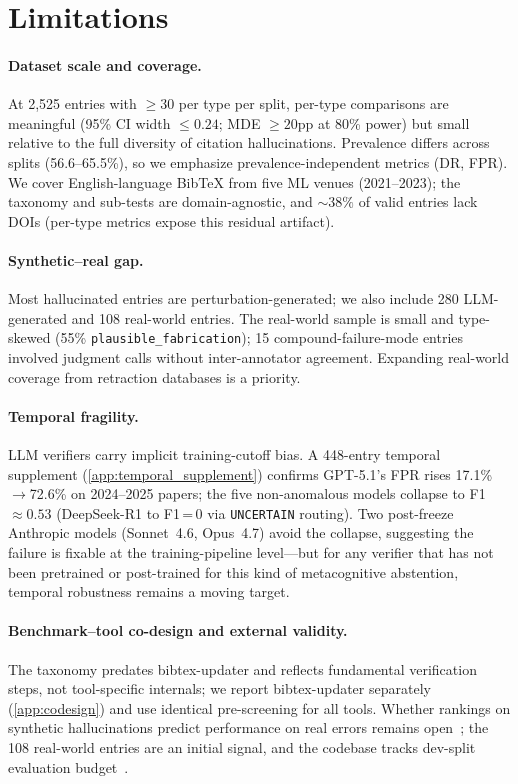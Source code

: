 \section{Limitations}
\label{sec:limitations}

\paragraph{Dataset scale and coverage.}
At 2,525 entries with $\geq$30 per type per split, per-type comparisons are meaningful (95\% CI width $\leq 0.24$; MDE $\geq 20$pp at 80\% power) but small relative to the full diversity of citation hallucinations.
Prevalence differs across splits (56.6--65.5\%), so we emphasize prevalence-independent metrics (DR, FPR).
We cover English-language BibTeX from five ML venues (2021--2023); the taxonomy and sub-tests are domain-agnostic, and ${\sim}38\%$ of valid entries lack DOIs (per-type metrics expose this residual artifact).

\paragraph{Synthetic--real gap.}
Most hallucinated entries are perturbation-generated; we also include 280 LLM-generated and 108 real-world entries.
The real-world sample is small and type-skewed (55\% \texttt{plausible\_fabrication}); 15 compound-failure-mode entries involved judgment calls without inter-annotator agreement.
Expanding real-world coverage from retraction databases is a priority.

\paragraph{Temporal fragility.}
LLM verifiers carry implicit training-cutoff bias.
A 448-entry temporal supplement (\cref{app:temporal_supplement}) confirms GPT-5.1's FPR rises 17.1\%$\to$72.6\% on 2024--2025 papers; the five non-anomalous models collapse to F1\,${\approx}0.53$ (DeepSeek-R1 to F1\,=\,0 via \texttt{UNCERTAIN} routing). Two post-freeze Anthropic models (Sonnet~4.6, Opus~4.7) avoid the collapse, suggesting the failure is fixable at the training-pipeline level---but for any verifier that has not been pretrained or post-trained for this kind of metacognitive abstention, temporal robustness remains a moving target.

\paragraph{Benchmark--tool co-design and external validity.}
The taxonomy predates bibtex-updater and reflects fundamental verification steps, not tool-specific internals; we report bibtex-updater separately (\cref{app:codesign}) and use identical pre-screening for all tools.
Whether rankings on synthetic hallucinations predict performance on real errors remains open~\citep{hardt2025benchmarks}; the 108 real-world entries are an initial signal, and the codebase tracks dev-split evaluation budget~\citep{dwork2015}.
